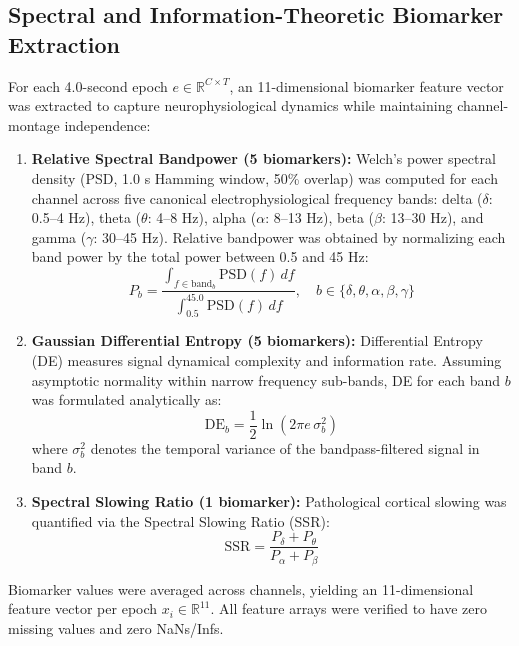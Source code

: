 \documentclass[11pt,a4paper]{article}
\begin{document}
\subsection{Spectral and Information-Theoretic Biomarker Extraction}
For each 4.0-second epoch $e \in \mathbb{R}^{C \times T}$, an 11-dimensional biomarker feature vector was extracted to capture neurophysiological dynamics while maintaining channel-montage independence:
\begin{enumerate}
    \item \textbf{Relative Spectral Bandpower (5 biomarkers):} Welch's power spectral density (PSD, 1.0 s Hamming window, 50\% overlap) was computed for each channel across five canonical electrophysiological frequency bands: delta ($\delta$: 0.5--4 Hz), theta ($\theta$: 4--8 Hz), alpha ($\alpha$: 8--13 Hz), beta ($\beta$: 13--30 Hz), and gamma ($\gamma$: 30--45 Hz). Relative bandpower was obtained by normalizing each band power by the total power between 0.5 and 45 Hz:
    \begin{equation}
        P_b = \frac{\int_{f \in \text{band}_b} \text{PSD}(f)\,df}{\int_{0.5}^{45.0} \text{PSD}(f)\,df}, \quad b \in \{\delta, \theta, \alpha, \beta, \gamma\}
    \end{equation}
    \item \textbf{Gaussian Differential Entropy (5 biomarkers):} Differential Entropy (DE) measures signal dynamical complexity and information rate. Assuming asymptotic normality within narrow frequency sub-bands, DE for each band $b$ was formulated analytically as:
    \begin{equation}
        \text{DE}_b = \frac{1}{2} \ln\left(2 \pi e \, \sigma_b^2\right)
    \end{equation}
    where $\sigma_b^2$ denotes the temporal variance of the bandpass-filtered signal in band $b$.
    \item \textbf{Spectral Slowing Ratio (1 biomarker):} Pathological cortical slowing was quantified via the Spectral Slowing Ratio (SSR):
    \begin{equation}
        \text{SSR} = \frac{P_\delta + P_\theta}{P_\alpha + P_\beta}
    \end{equation}
\end{enumerate}
Biomarker values were averaged across channels, yielding an 11-dimensional feature vector per epoch $x_i \in \mathbb{R}^{11}$. All feature arrays were verified to have zero missing values and zero NaNs/Infs.
\end{document}

